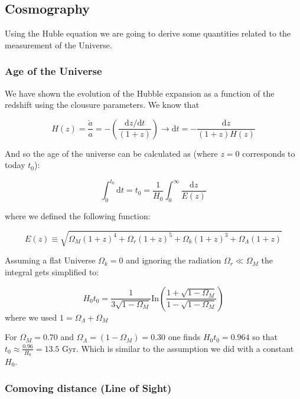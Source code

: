 \documentclass[
  letterpaper,
  DIV=11,
  numbers=noendperiod]{scrreprt}
\begin{document}
\subsection*{Cosmography}\label{cosmography}

Using the Huble equation we are going to derive some quantities related
to the measurement of the Universe.

\subsubsection*{Age of the Universe}\label{age-of-the-universe}

We have shown the evolution of the Hubble expansion as a function of the
redshift using the clousure parameters. We know that

\[H(z) = \frac{\dot a}{a} = -\left(\frac{\mathrm{ d}z/\mathrm{ d}t}{(1+z)}\right) \rightarrow \mathrm{ d}t = -\frac{\mathrm{ d}z}{(1+z)H(z)}\]

And so the age of the universe can be calculated as (where \(z=0\)
corresponds to today \(t_0\)):

\[\int_{0}^{t_0} \mathrm{ d} t = t_0 = \frac{1}{H_0} \int^\infty_0 \frac{\mathrm{ d}z}{E(z)}\]

where we defined the following function:

\[E(z)\equiv \sqrt{\Omega_M(1+z)^4 + \Omega_r(1+z)^5 + \Omega_k(1+z)^3 +\Omega_\Lambda(1+z)}\]

Assuming a flat Universe \(\Omega_k =0\) and ignoring the radiation
\(\Omega_r \ll \Omega_M\) the integral gets simplified to:

\[H_0 t_0 = \frac{1}{3\sqrt{1 - \Omega_M}}\mathrm{ In}\left(\frac{1+\sqrt{1 - \Omega_M}}{1 - \sqrt{1- \Omega_M}}\right)\]
where we used \(1 = \Omega_\Lambda + \Omega_M\)

For \(\Omega_M = 0.70\) and \(\Omega_\Lambda = (1 - \Omega_M) = 0.30\)
one finds \(H_0 t_0 = 0.964\) so that
\(t_0 \approx \frac{0.96}{H_0} = 13.5\) Gyr. Which is similar to the
assumption we did with a constant \(H_0\).

\subsubsection*{Comoving distance (Line of
Sight)}\label{comoving-distance-line-of-sight}
\end{document}

